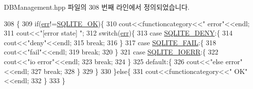 D\+B\+Management.\+hpp 파일의 308 번째 라인에서 정의되었습니다.


\begin{DoxyCode}
308                                                   \{
309                 \textcolor{keywordflow}{if}(\hyperlink{class_tetris_1_1_d_b_management_1_1_d_b_manager_a9ea8d963f1a9b8117fa5e92b54eda114}{err}!=\hyperlink{sqlite3_8h_a650d09c7bec7ddadb7c8aa3519dc842c}{SQLITE\_OK})\{
310                     cout<<functioncategory<<\textcolor{stringliteral}{" error"}<<endl;
311                     cout<<\textcolor{stringliteral}{"[error state] "};
312                     \textcolor{keywordflow}{switch}(\hyperlink{class_tetris_1_1_d_b_management_1_1_d_b_manager_a9ea8d963f1a9b8117fa5e92b54eda114}{err})\{
313                         \textcolor{keywordflow}{case} \hyperlink{sqlite3_8h_aac54c702b6175785e3300e9172b5f9bb}{SQLITE\_DENY}:\{
314                             cout<<\textcolor{stringliteral}{"deny"}<<endl;
315                             \textcolor{keywordflow}{break};
316                         \}
317                         \textcolor{keywordflow}{case} \hyperlink{sqlite3_8h_aa100fc12f824c5d55ce14e523047521d}{SQLITE\_FAIL}:\{
318                             cout<<\textcolor{stringliteral}{"fail"}<<endl;
319                             \textcolor{keywordflow}{break};
320                         \}
321                         \textcolor{keywordflow}{case} \hyperlink{sqlite3_8h_a45a4718698f155ae3b45d37d3b94d9a2}{SQLITE\_IOERR}:\{
322                             cout<<\textcolor{stringliteral}{"io error"}<<endl;
323                             \textcolor{keywordflow}{break};
324                         \}
325                         \textcolor{keywordflow}{default}:\{
326                             cout<<\textcolor{stringliteral}{"else error"}<<endl;
327                             \textcolor{keywordflow}{break};
328                         \}
329                     \}
330                 \}\textcolor{keywordflow}{else}\{
331                     cout<<functioncategory<<\textcolor{stringliteral}{" OK"}<<endl;
332                 \}
333             \}
\end{DoxyCode}
\mbox{\label{class_tetris_1_1_d_b_management_1_1_d_b_manager_a8bf7e756a9cca7e57fef00076fb62f36}} 
